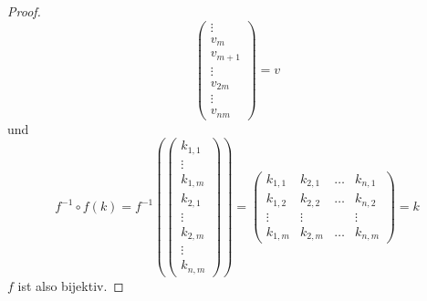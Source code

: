 \documentclass[a4paper,10pt]{article}
\begin{document}
\begin{proof}
\begin{equation}
\begin{pmatrix}
                 \vdots\\
                 v_m\\
                 v_{m + 1}\\
                 \vdots\\
                 v_{2m}\\
                 \vdots\\
                 v_{nm}
                \end{pmatrix} = v
 \end{equation}
 und
 \begin{equation}
  f^{-1} \circ f(k) = f^{-1}(\begin{pmatrix}
          k_{1,1}\\
          \vdots\\
          k_{1,m}\\
          k_{2,1}\\
          \vdots\\
          k_{2,m}\\
          \vdots\\
          k_{n,m}
         \end{pmatrix})
         = \begin{pmatrix}
            k_{1,1} & k_{2,1} & \dots & k_{n,1}\\
            k_{1,2} & k_{2,2} & \dots & k_{n,2}\\
            \vdots & \vdots & & \vdots\\
            k_{1,m} & k_{2,m} & \dots & k_{n,m}
           \end{pmatrix} = k
 \end{equation}
 $f$ ist also bijektiv.
 

\end{proof}
\end{document}
